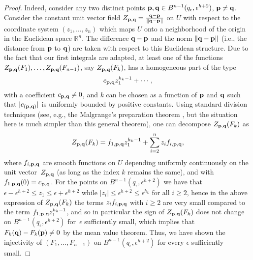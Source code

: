 \documentclass[11pt]{article}
\numberwithin{equation}{section}
\begin{document}
\begin{proof}
Indeed, consider any two distinct points ${\bf p},{\bf q} \in B^{n-1}(q_\epsilon, \epsilon^{h+2})$, ${\bf p} \neq {\bf q}$.
Consider the constant unit vector f\/ield $Z_{{\bf p},{\bf q}} = \frac{{\bf q} - {\bf p}}{\|{\bf q} - {\bf p} \|}$
on $U$ with respect to the coordinate system $(z_1,\dots, z_n)$ which maps
$U$ onto a neighborhood of the origin in the Euclidean space $\mathbb{R}^n$.
The dif\/ference ${\bf q} - {\bf p}$ and the norm $\|{\bf q} - {\bf p} \|$
(i.e., the distance from ${\bf p}$ to ${\bf q}$) are taken with respect
to this Euclidean structure. Due to the fact that our
f\/irst integrals are adapted, at least one of the functions
$Z_{{\bf p},{\bf q}}(F_1), \dots, Z_{{\bf p},{\bf q}}(F_{n-1})$,
say $Z_{{\bf p},{\bf q}}(F_k)$, has a homogeneous part of the type
\begin{gather*} c_{{\bf p},{\bf q}} z_1^{h_k -1} + \cdots,
\end{gather*}
with a coef\/f\/icient $c_{{\bf p},{\bf q}} \neq 0$, and $k$ can be chosen
as a function of ${\bf p}$ and ${\bf q}$ such that $|c_{({\bf p},{\bf q})}|$
is uniformly bounded by positive constants. Using standard division techniques
(see, e.g., the Malgrange's preparation
theorem \cite{Malgrange-Ideal1967}, but the situation here is much simpler than this general theorem), one can decompose $Z_{{\bf p},{\bf q}}(F_k)$ as
\begin{gather*} Z_{{\bf p},{\bf q}}(F_k) = f_{1, {\bf p},{\bf q}}z_1^{h_k-1}
+ \sum_{i=2}^n z_i f_{i, {\bf p},{\bf q}},\end{gather*}
where $f_{i, {\bf p},{\bf q}}$ are smooth functions on $U$ depending uniformly
continuously on the unit vector~$Z_{{\bf p},{\bf q}}$ (as long as the index $k$ remains the same), and with $f_{1, {\bf p},{\bf q}}(0) = c_{{\bf p},{\bf q}}$.
For the points on $B^{n-1}(q_\epsilon, \epsilon^{h+2})$ we have that
$\epsilon - \epsilon^{h+2} \leq z_1 \leq \epsilon + \epsilon^{h+2}$
while $|z_i| \leq \epsilon^{h+2} \leq \epsilon^{h_k}$ for all $i \geq 2$,
hence in the above expression of $Z_{{\bf p},{\bf q}}(F_k)$ the terms
$z_i f_{i, {\bf p},{\bf q}}$ with $i \geq 2$ are very small compared to the
term $f_{1, {\bf p},{\bf q}}z_1^{h_k-1}$, and so in particular the sign of
$Z_{{\bf p},{\bf q}}(F_k)$ does not change on $B^{n-1}(q_\epsilon, \epsilon^{h+2})$ for~$\epsilon$ suf\/f\/iciently small, which implies that
$F_k({\bf q}) - F_k({\bf p}) \neq 0$ by the mean value theorem. Thus, we have shown the injectivity of $(F_1,\dots, F_{n-1})$ on $B^{n-1}(q_\epsilon, \epsilon^{h+2})$ for every $\epsilon$ suf\/f\/iciently small.


\end{proof}
\end{document}
